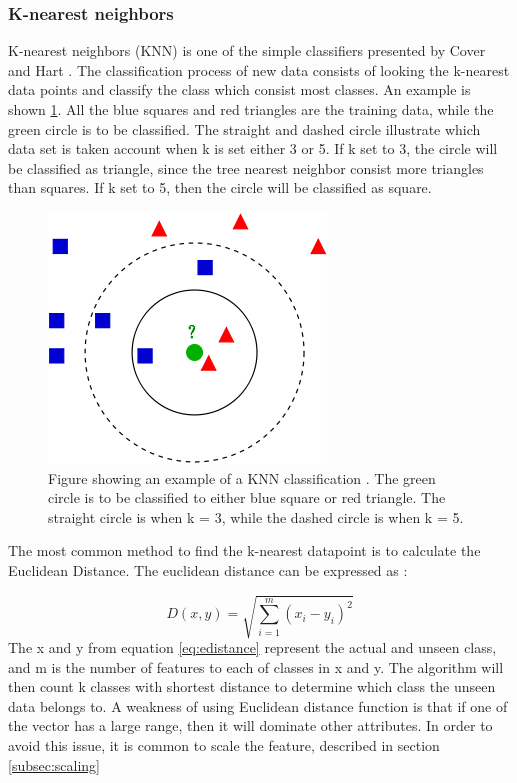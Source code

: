 \documentclass[USenglish]{ifimaster}  %
\begin{document}
	\subsubsection{K-nearest neighbors }
	K-nearest neighbors (KNN) is one of the simple classifiers presented by Cover and Hart \cite{1053964}. The classification process of new data consists of looking the k-nearest data points and classify the class which consist most classes. An example is shown \ref{fig:KNN}. All the blue squares and red triangles are the training data, while the green circle is to be classified. The straight and dashed circle illustrate which data set is taken account when k is set either 3 or 5. If k set to  3, the circle will be classified as triangle, since the tree nearest neighbor consist more triangles than squares. If k set to 5, then the circle will be classified as square.
	
	\begin{figure}[h]
		\centering
		\includegraphics[scale=0.5]{Figures/KNN.png}
		\caption{Figure showing an example of a KNN classification \cite{KnnClassification}. The green circle is to be classified to either blue square or red triangle. The straight circle is when k = 3, while the dashed circle is when k = 5.}
		\label{fig:KNN}
	\end{figure}
	
	The most common method to find the k-nearest datapoint is to calculate the Euclidean Distance. The euclidean distance can be expressed as \cite{Bao2004}:
	
	
	\begin{equation}
	D(x,y)=\sqrt{\sum_{i=1}^{m}(x_{i}-y_{i})^2}
	\label{eq:edistance}
	\end{equation}
	The x and y from equation \ref{eq:edistance} represent the actual and unseen class, and m is the number of features to each of classes in x and y. The algorithm will then count k classes with shortest distance to determine which class the unseen data belongs to. A weakness of using Euclidean distance function is that if one of the vector has a large range, then it will dominate other attributes. In order to avoid this issue, it is common to scale the feature, described in section \ref{subsec:scaling}
	
\end{document}
